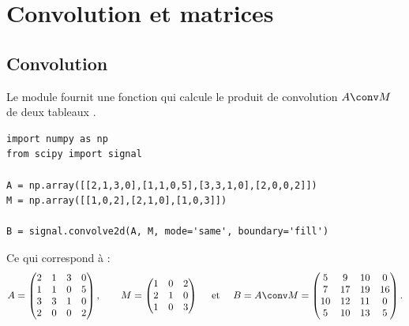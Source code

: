 \documentclass[11pt,class=report,crop=false]{standalone}
\begin{document}
 







\section{Convolution et matrices}

\subsection{Convolution}

Le module  fournit une fonction  qui calcule le produit de convolution $A \conv M$ de deux tableaux \numpy{}.

\begin{lstlisting}
import numpy as np
from scipy import signal

A = np.array([[2,1,3,0],[1,1,0,5],[3,3,1,0],[2,0,0,2]])
M = np.array([[1,0,2],[2,1,0],[1,0,3]])

B = signal.convolve2d(A, M, mode='same', boundary='fill')
\end{lstlisting}

Ce qui correspond à :
$$A = 
 \begin{pmatrix}
2&1&3&0 \\
1&1&0&5 \\
3&3&1&0 \\
2&0&0&2 \\
\end{pmatrix},
\qquad
M = 
\begin{pmatrix}
1&0&2 \\
2&1&0 \\
1&0&3 \\
\end{pmatrix}
\quad\mbox{ et }\quad
B = A \conv M = 
\begin{pmatrix}
 5 & 9  & 10 & 0 \\
 7 & 17 & 19 & 16 \\
10 & 12 & 11 & 0 \\
 5 & 10 & 13 & 5 \\
\end{pmatrix}.$$
\end{document}
